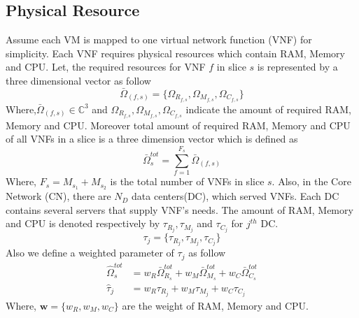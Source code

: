 \documentclass[conference]{IEEEtran}
\begin{document}
\subsection{Physical Resource}
Assume each VM is mapped to one virtual network function (VNF) for simplicity. Each VNF requires
physical resources which contain RAM, Memory and CPU.
Let, the required resources for VNF $f$ in slice $s$ is represented by a three dimensional vector as follow
\begin{equation}
\bar{\Omega}_{(f,s)} = \{\Omega_{R_{f,s}}, \Omega_{M_{f,s}}, \Omega_{C_{f,s}} \}
\end{equation} 
Where,$\bar{\Omega}_{(f,s)}\in \mathbb{C}^{3}$ and $\Omega_{R_{f,s}}, \Omega_{M_{f,s}}, \Omega_{C_{f,s}}$ indicate the amount of required RAM, Memory and CPU.
Moreover total amount of required RAM, Memory and CPU of all VNFs in a slice is a three dimension vector which is defined as
\begin{equation}
\bar{\Omega}_{s}^{tot} = \sum_{f=1}^{F_s}\bar{\Omega}_{(f,s)}
\end{equation}
Where, $F_s = M_{s_1} + M_{s_2}$ is the total number of VNFs in slice $s$.
\newline
Also, in the Core Network (CN), there are $N_{D}$ data centers(DC), which served VNFs. Each DC contains several servers that supply VNF's needs.
The amount of RAM, Memory and CPU is denoted respectively by $\tau_{R_{j}}, \tau_{M_{j}}$ and $\tau_{C_{j}} $ for $j^{th}$ DC.
\begin{equation*}
\tau_j = \{\tau_{R_{j}}, \tau_{M_{j}}, \tau_{C_{j}} \}
\end{equation*}
Also we define a weighted parameter of $\tau_j$ as follow
\begin{equation}\label{wt}
\begin{split}
\hat{\Omega}_{s}^{tot} &= w_R \bar{\Omega}_{R_s}^{tot} + w_M \bar{\Omega}_{M_s}^{tot} + w_C \bar{\Omega}_{C_s}^{tot} \\
\hat{\tau}_j &= w_R \tau_{R_{j}} + w_M \tau_{M_{j}} + w_C \tau_{C_{j}}
\end{split}
\end{equation}
Where, $\boldsymbol{w} = \{w_R, w_M, w_C\}$ are the weight of RAM, Memory and CPU.
\end{document}
